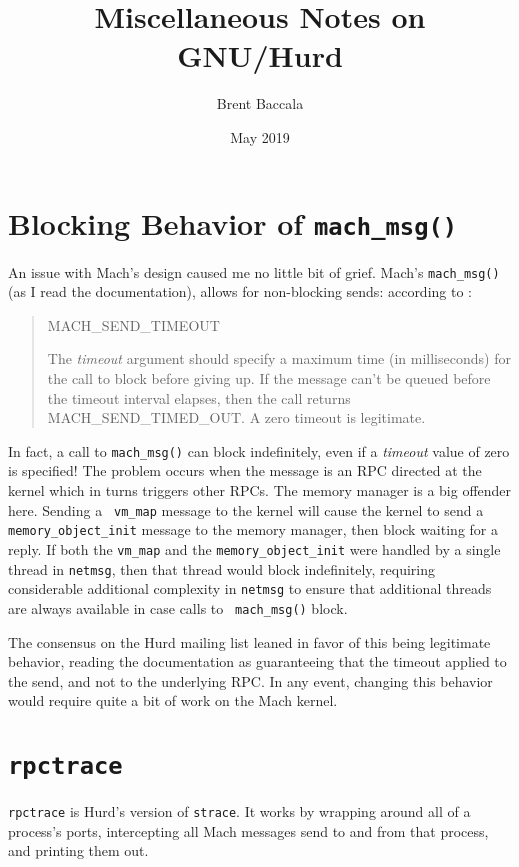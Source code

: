 \documentclass{article}
\title{Miscellaneous Notes on GNU/Hurd}
\author{Brent Baccala}
\date{May 2019}
\def\rpctrace{{\tt rpctrace}\xspace}
\def\netmsg{{\tt netmsg}\xspace}
\def\moinit{{\tt memory_object_init}\xspace}
\begin{document}
\maketitle

\tableofcontents

\vfill\eject

\section{Blocking Behavior of {\tt mach_msg()}}

An issue with Mach's design caused me no little bit of grief.
Mach's {\tt mach_msg()} (as I read the documentation),
allows for non-blocking sends: according to \cite{interfaces}:

\begin{quote}
MACH_SEND_TIMEOUT

The {\it timeout} argument should specify a maximum time (in
milliseconds) for the call to block before giving up. If the message
can’t be queued before the timeout interval elapses, then the call
returns MACH_SEND_TIMED_OUT. A zero timeout is legitimate.
\end{quote}

In fact, a call to {\tt mach_msg()} can block indefinitely, even if a
{\it timeout} value of zero is specified!  The problem occurs when the
message is an RPC directed at the kernel which in turns triggers other
RPCs.  The memory manager is a big offender here.  Sending a {\tt
  vm_map} message to the kernel will cause the kernel to send a
\moinit message to the memory manager, then block waiting for a reply.
If both the {\tt vm_map} and the \moinit were handled by a single
thread in \netmsg, then that thread would block indefinitely,
requiring considerable additional complexity in \netmsg to ensure that
additional threads are always available in case calls to {\tt
  mach_msg()} block.

The consensus on the Hurd mailing list leaned in favor of this being
legitimate behavior, reading the documentation as guaranteeing that
the timeout applied to the send, and not to the underlying RPC.  In
any event, changing this behavior would require quite a bit of work on
the Mach kernel.

\section{\rpctrace}

\rpctrace is Hurd's version of {\tt strace}.  It works by wrapping
around all of a process's ports, intercepting all Mach messages send
to and from that process, and printing them out.
\end{document}
